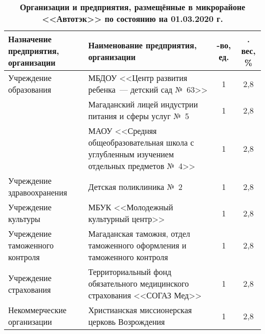 \begin{table}[h!]
\caption*{\textbf{Организации и предприятия, размещённые в микрорайоне <<Автотэк>> по состоянию на 01.03.2020 г.}}
\label{tab:kodirev-tab-1}
\begin{changemargin}{-1cm}{-1cm}
\begin{tabular}{p{5cm}p{7cm}cc}
   \toprule
Назначение предприятия, организации &
Наименование предприятия, организации &
 \parbox[c][][c]{0.1\textwidth}{ -во, ед.} &
  \parbox[c][][c]{0.1\textwidth}{ . вес, \%} \\
   \toprule
Учреждение 				образования              & МБДОУ <<Центр развития ребенка~--- детский сад №~63>>                            & 1               & 2,8               \\
\cmidrule(r){2-4}                                        & Магаданский 				лицей индустрии питания и сферы услуг 				№~5                                                                                              & 1               & 2,8               \\
\cmidrule(r){2-4}                                        & МАОУ <<Средняя общеобразовательная школа с углубленным изучением отдельных предметов №~4>> & 1               & 2,8               \\ \midrule
Учреждение 				здравоохранения          & Детская 				поликлиника №~2                                                                                                                               & 1               & 2,8               \\ \midrule
Учреждение 				культуры                 & МБУК <<Молодежный культурный центр>>                                                           & 1               & 2,8               \\ \midrule
Учреждение 				таможенного контроля     & Магаданская 				таможня, отдел таможенного оформления 				и таможенного контроля                                                                          & 1               & 2,8               \\ \midrule
Учреждение 				страхования              & Территориальный 				фонд обязательного медицинского 				страхования <<СОГАЗ Мед>>                                                                           & 1               & 2,8               \\ \midrule
Некоммерческие 				организации          & Христианская миссионерская 				церковь Возрождения                                                                             & 1               & 2,8               \\

\end{tabular}
\end{changemargin}
\end{table}
